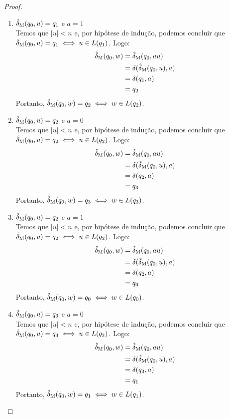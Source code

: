 \begin{proof}
\begin{enumerate}[label=\textbf{(\arabic*)}]
\item $\operatorname{\hat{\delta}_M}(q_0, u) = q_1$ e $a = 1$\\
Temos que $|u| < n$ e, por hipótese de indução, podemos concluir que $\operatorname{\hat{\delta}_M}(q_0, u) = q_1 \iff u \in L(q_1)$. Logo:
\begin{align*}
    \operatorname{\hat{\delta}_M}(q_0, w) &= \operatorname{\hat{\delta}_M}(q_0, au)\\
                    &= \delta(\operatorname{\hat{\delta}_M}(q_0, u), a)\\
                    &= \delta(q_1, a)\\
                    &= q_2
\end{align*}
Portanto, $\operatorname{\hat{\delta}_M}(q_0, w) = q_2 \iff w \in L(q_2)$.

\item $\operatorname{\hat{\delta}_M}(q_0, u) = q_2$ e $a = 0$\\
Temos que $|u| < n$ e, por hipótese de indução, podemos concluir que $\operatorname{\hat{\delta}_M}(q_0, u) = q_2 \iff u \in L(q_2)$. Logo:
\begin{align*}
    \operatorname{\hat{\delta}_M}(q_0, w) &= \operatorname{\hat{\delta}_M}(q_0, au)\\
                    &= \delta(\operatorname{\hat{\delta}_M}(q_0, u), a)\\
                    &= \delta(q_2, a)\\
                    &= q_3
\end{align*}
Portanto, $\operatorname{\hat{\delta}_M}(q_0, w) = q_3 \iff w \in L(q_3)$.

\item $\operatorname{\hat{\delta}_M}(q_0, u) = q_2$ e $a = 1$\\
Temos que $|u| < n$ e, por hipótese de indução, podemos concluir que $\operatorname{\hat{\delta}_M}(q_0, u) = q_2 \iff u \in L(q_2)$. Logo:
\begin{align*}
    \operatorname{\hat{\delta}_M}(q_0, w) &= \operatorname{\hat{\delta}_M}(q_0, au)\\
                    &= \delta(\operatorname{\hat{\delta}_M}(q_0, u), a)\\
                    &= \delta(q_2, a)\\
                    &= q_0
\end{align*}
Portanto, $\operatorname{\hat{\delta}_M}(q_0, w) = q_0 \iff w \in L(q_0)$.

\item $\operatorname{\hat{\delta}_M}(q_0, u) = q_3$ e $a = 0$\\
Temos que $|u| < n$ e, por hipótese de indução, podemos concluir que $\operatorname{\hat{\delta}_M}(q_0, u) = q_3 \iff u \in L(q_3)$. Logo:
\begin{align*}
    \operatorname{\hat{\delta}_M}(q_0, w) &= \operatorname{\hat{\delta}_M}(q_0, au)\\
                    &= \delta(\operatorname{\hat{\delta}_M}(q_0, u), a)\\
                    &= \delta(q_3, a)\\
                    &= q_1
\end{align*}
Portanto, $\operatorname{\hat{\delta}_M}(q_0, w) = q_1 \iff w \in L(q_1)$.


\end{enumerate}
\end{proof}
